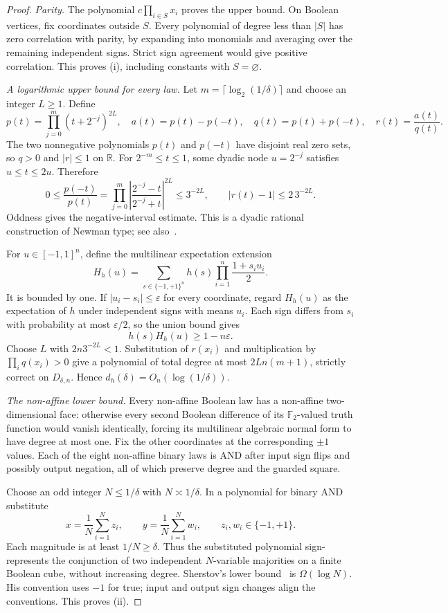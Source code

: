 \documentclass[11pt]{article}
\theoremstyle{definition}
\theoremstyle{remark}
\newcommand{\R}{\mathbb{R}}
\newcommand{\Ftwo}{\mathbb{F}_2}
\newcommand{\eps}{\varepsilon}
\begin{document}
\begin{proof}
\emph{Parity.} The polynomial $c\prod_{i\in S}x_i$ proves the upper bound. On Boolean vertices, fix coordinates outside $S$. Every polynomial of degree less than $|S|$ has zero correlation with parity, by expanding into monomials and averaging over the remaining independent signs. Strict sign agreement would give positive correlation. This proves (i), including constants with $S=\varnothing$.

\emph{A logarithmic upper bound for every law.} Let $m=\lceil\log_2(1/\delta)\rceil$ and choose an integer $L\ge1$. Define
\[
 p(t)=\prod_{j=0}^m(t+2^{-j})^{2L},\quad
 a(t)=p(t)-p(-t),\quad q(t)=p(t)+p(-t),\quad r(t)=\frac{a(t)}{q(t)}.
\]
The two nonnegative polynomials $p(t)$ and $p(-t)$ have disjoint real zero sets, so $q>0$ and $|r|\le1$ on $\R$. For $2^{-m}\le t\le1$, some dyadic node $u=2^{-j}$ satisfies $u\le t\le2u$. Therefore
\[
 0\le\frac{p(-t)}{p(t)}
 =\prod_{j=0}^m\left|\frac{2^{-j}-t}{2^{-j}+t}\right|^{2L}
 \le3^{-2L},\qquad |r(t)-1|\le2\,3^{-2L}.
\]
Oddness gives the negative-interval estimate. This is a dyadic rational construction of Newman type; see also~\cite[Theorem~2.4]{Sherstov2013}.

For $u\in[-1,1]^n$, define the multilinear expectation extension
\[
 H_h(u)=\sum_{s\in\{-1,+1\}^n}h(s)\prod_{i=1}^n\frac{1+s_i u_i}{2}.
\]
It is bounded by one. If $|u_i-s_i|\le\eps$ for every coordinate, regard $H_h(u)$ as the expectation of $h$ under independent signs with means $u_i$. Each sign differs from $s_i$ with probability at most $\eps/2$, so the union bound gives
\begin{equation}\label{eq:extensionmargin}
 h(s)H_h(u)\ge1-n\eps.
\end{equation}
Choose $L$ with $2n3^{-2L}<1$. Substitution of $r(x_i)$ and multiplication by $\prod_iq(x_i)>0$ give a polynomial of total degree at most $2Ln(m+1)$, strictly correct on $D_{\delta,n}$. Hence $d_h(\delta)=O_n(\log(1/\delta))$.

\emph{The non-affine lower bound.} Every non-affine Boolean law has a non-affine two-dimensional face: otherwise every second Boolean difference of its $\Ftwo$-valued truth function would vanish identically, forcing its multilinear algebraic normal form to have degree at most one. Fix the other coordinates at the corresponding $\pm1$ values. Each of the eight non-affine binary laws is AND after input sign flips and possibly output negation, all of which preserve degree and the guarded square.

Choose an odd integer $N\le1/\delta$ with $N\asymp1/\delta$. In a polynomial for binary AND substitute
\[
 x=\frac1N\sum_{i=1}^N z_i,\qquad
 y=\frac1N\sum_{i=1}^N w_i,\qquad z_i,w_i\in\{-1,+1\}.
\]
Each magnitude is at least $1/N\ge\delta$. Thus the substituted polynomial sign-represents the conjunction of two independent $N$-variable majorities on a finite Boolean cube, without increasing degree. Sherstov's lower bound~\cite[Theorem~1.10]{Sherstov2013} is $\Omega(\log N)$. His convention uses $-1$ for true; input and output sign changes align the conventions. This proves (ii).


\end{proof}
\end{document}
